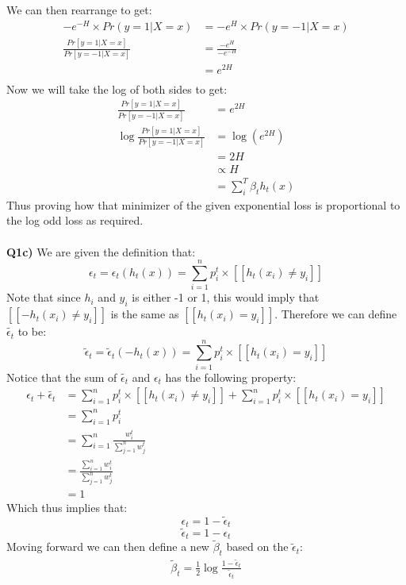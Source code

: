\documentclass{article}
\begin{document}
\begin{titlepage}
We can then rearrange to get:
\begin{align*}
-e^{-H}\times Pr(y=1 | X=x) &=  -e^{H}\times Pr(y=-1 | X=x)  \\
\frac{Pr[ y = 1 | X = x ]}{Pr[ y = -1 | X = x ]} &= \frac{-e^H}{-e^{-H}} \\
&= e^{2H} \\
\end{align*}
Now we will take the log of both sides to get:
\begin{align*}
\frac{Pr[ y = 1 | X = x ]}{Pr[ y = -1 | X = x ]} &= e^{2H} \\
\log\frac{Pr[ y = 1 | X = x ]}{Pr[ y = -1 | X = x ]} &= \log(e^{2H}) \\
&=  2H \\
&\propto H \\
&= \sum_i^T \beta_th_t(x)
\end{align*}
Thus proving how that minimizer of the given exponential loss is proportional to the log odd loss as required.\\\\
\textbf{Q1c)} We are given the definition that:
\[ \epsilon_t = \epsilon_t(h_t(x)) = \sum_{i=1}^n p^t_i \times [[h_t(x_i) \neq y_i ]]  \]
Note that since $h_i$ and $y_i$ is either -1 or 1, this would imply that $[[-h_t(x_i) \neq y_i ]]$ is the same as $[[h_t(x_i) = y_i ]]$. Therefore we can define $\widetilde{\epsilon_t}$ to be:
\[ \widetilde{\epsilon}_t = \widetilde{\epsilon}_t(-h_t(x)) = \sum_{i=1}^n p^t_i \times [[h_t(x_i) = y_i ]] \]
Notice that the sum of $\widetilde{\epsilon_t}$ and $\epsilon_t$ has the following property:
\begin{align*}
\epsilon_t + \widetilde{\epsilon_t} &= \sum_{i=1}^n p^t_i \times [[h_t(x_i) \neq y_i ]] + \sum_{i=1}^n p^t_i \times [[h_t(x_i) = y_i ]] \\
&= \sum_{i=1}^n p^t_i \\
&= \sum_{i=1}^n \frac{w_i^t}{\sum_{j=1}^n w_j^t}\\
&= \frac{\sum_{i=1}^nw_i^t}{\sum_{j=1}^n w_j^t} \\
&= 1
\end{align*}
Which thus implies that:
\[ \epsilon_t = 1 - \widetilde{\epsilon}_t \]
\[ \widetilde{\epsilon}_t = 1 - \epsilon_t \]
\newpage
Moving forward we can then define a new $\widetilde{\beta}_t$ based on the $\widetilde{\epsilon}_t$:
\begin{align*}
\widetilde{\beta}_t = \frac{1}{2} \log \frac{1-\widetilde{\epsilon}_t}{\widetilde{\epsilon}_t}
\end{align*}

\end{titlepage}
\end{document}
